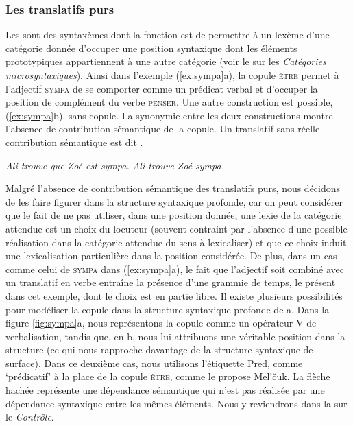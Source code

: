 \subsubsection{Les translatifs purs} 
Les  sont des syntaxèmes dont la fonction est de permettre à un lexème d’une catégorie donnée d’occuper une position syntaxique dont les éléments prototypiques appartiennent à une autre catégorie (voir le  sur les \textit{Catégories microsyntaxiques}). Ainsi dans l’exemple (\ref{ex:sympa}a), la copule \textsc{être} permet à l’adjectif \textsc{sympa} de se comporter comme un prédicat verbal et d’occuper la position de complément du verbe \textsc{penser}. Une autre construction est possible, (\ref{ex:sympa}b), sans copule. La synonymie entre les deux constructions montre l’absence de contribution sémantique de la copule. Un translatif sans réelle contribution sémantique est dit .

\ea\label{ex:sympa}
    \ea \textit{Ali trouve que Zoé est sympa.}
\ex \textit{Ali trouve Zoé sympa.}\z\z

Malgré l’absence de contribution sémantique des translatifs purs, nous décidons de les faire figurer dans la structure syntaxique profonde, car on peut considérer que le fait de ne pas utiliser, dans une position donnée, une lexie de la catégorie attendue est un choix du locuteur (souvent contraint par l’absence d’une possible réalisation dans la catégorie attendue du sens à lexicaliser) et que ce choix induit une lexicalisation particulière dans la position considérée. De plus, dans un cas comme celui de \textsc{sympa} dans (\ref{ex:sympa}a), le fait que l’adjectif soit combiné avec un translatif en verbe entraîne la présence d’une grammie de temps, le présent dans cet exemple, dont le choix est en partie libre. 
Il existe plusieurs possibilités pour modéliser la copule dans la structure syntaxique profonde de a. Dans la figure \ref{fig:sympa}a, nous représentons la copule comme un opérateur V de verbalisation, tandis que, en b, nous lui attribuons une véritable position dans la structure (ce qui nous rapproche davantage de la structure syntaxique de surface). Dans ce deuxième cas, nous utilisons l’étiquette Pred, comme ‘prédicatif’ à la place de la copule \textsc{être}, comme le propose Mel’čuk. La flèche hachée représente une dépendance sémantique qui n’est pas réalisée par une dépendance syntaxique entre les mêmes éléments. Nous y reviendrons dans la  sur le \textit{Contrôle}.


